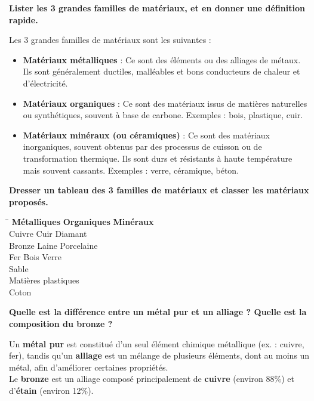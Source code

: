 \documentclass{exam}
\begin{document}
\begin{questions}

\question[1] \textbf{Lister les 3 grandes familles de matériaux, et en donner une définition rapide.}

Les 3 grandes familles de matériaux sont les suivantes :
\begin{itemize}
    \item \textbf{Matériaux métalliques} : Ce sont des éléments ou des alliages de métaux. Ils sont généralement ductiles, malléables et bons conducteurs de chaleur et d'électricité.
    \item \textbf{Matériaux organiques} : Ce sont des matériaux issus de matières naturelles ou synthétiques, souvent à base de carbone. Exemples : bois, plastique, cuir.
    \item \textbf{Matériaux minéraux (ou céramiques)} : Ce sont des matériaux inorganiques, souvent obtenus par des processus de cuisson ou de transformation thermique. Ils sont durs et résistants à haute température mais souvent cassants. Exemples : verre, céramique, béton.
\end{itemize}

\question[1] \textbf{Dresser un tableau des 3 familles de matériaux et classer les matériaux proposés.}

\begin{tabbing}
    \hspace*{3cm}\=\hspace*{4cm}\=\kill
    \textbf{Métalliques} \> \textbf{Organiques} \> \textbf{Minéraux} \\
    Cuivre \> Cuir \> Diamant \\
    Bronze \> Laine \> Porcelaine \\
    Fer \> Bois \> Verre \\
    \>\> Sable \\
    \> Matières plastiques \> \\
    \> Coton \> \\
\end{tabbing}

\question[1] \textbf{Quelle est la différence entre un métal pur et un alliage ? Quelle est la composition du bronze ?}

Un \textbf{métal pur} est constitué d'un seul élément chimique métallique (ex. : cuivre, fer), tandis qu'un \textbf{alliage} est un mélange de plusieurs éléments, dont au moins un métal, afin d'améliorer certaines propriétés. \\
Le \textbf{bronze} est un alliage composé principalement de \textbf{cuivre} (environ 88\%) et d'\textbf{étain} (environ 12\%).


\end{questions}
\end{document}
